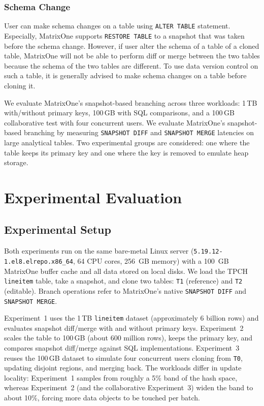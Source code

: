\documentclass[sigconf,nonacm]{acmart} %
\begin{document}
\subsubsection{Schema Change}
User can make schema changes on a table using \texttt{ALTER TABLE} 
statement.  Especially, MatrixOne supports \texttt{RESTORE TABLE} 
to a snapshot that was taken before the schema change.  However, 
if user alter the schema of a table of a cloned table, MatrixOne
will not be able to perform diff or merge between the two tables
because the schema of the two tables are different.  To use data
version control on such a table, it is generally advised to make 
schema changes on a table before cloning it. 


We evaluate MatrixOne's snapshot-based branching across three workloads: 1\,TB with/without primary keys, 100\,GB with SQL comparisons, and a 100\,GB collaborative test with four concurrent users.
We evaluate MatrixOne's snapshot-based branching by measuring
\texttt{SNAPSHOT DIFF} and \texttt{SNAPSHOT MERGE} latencies on large
analytical tables.  Two experimental groups are considered: one where
the table keeps its primary key and one where the key is removed to
emulate heap storage.

\section{Experimental Evaluation}
\subsection{Experimental Setup}
Both experiments run on the same bare-metal Linux server
(\texttt{5.19.12-1.el8.elrepo.x86\_64}, 64 CPU cores, 256~GB memory) with
a 100~GB MatrixOne buffer cache and all data stored on local disks.  We
load the TPCH \texttt{lineitem} table, take a snapshot, and clone two
tables: \texttt{T1} (reference) and \texttt{T2} (editable).  Branch
operations refer to MatrixOne's native \texttt{SNAPSHOT DIFF} and
\texttt{SNAPSHOT MERGE}.

Experiment~1 uses the 1\,TB \texttt{lineitem} dataset (approximately
6 billion rows) and evaluates snapshot diff/merge with and without
primary keys.  Experiment~2 scales the table to 100\,GB (about 600
million rows), keeps the primary key, and compares snapshot diff/merge
against SQL implementations.  Experiment~3 reuses the 100\,GB dataset to
simulate four concurrent users cloning from \texttt{T0}, updating disjoint
regions, and merging back.  The workloads differ in update locality:
Experiment~1 samples from roughly a 5\% band of the hash space, whereas
Experiment~2 (and the collaborative Experiment~3) widen the band to about
10\%, forcing more data objects to be touched per batch.
\end{document}
